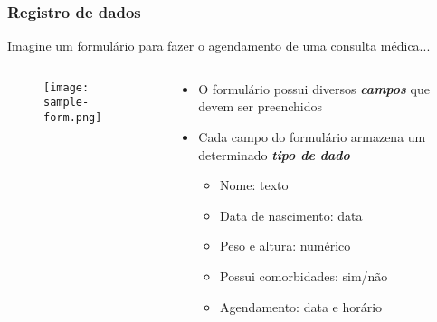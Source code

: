 \documentclass[t, 10pt, aspectratio=169, table, x11names]{beamer}
\begin{document}
	\begin{frame}
		\frametitle{Registro de dados}
		\vspace{3mm}
		Imagine um formulário para fazer o agendamento de uma consulta médica...
		\begin{columns}[t]
			\begin{column}{0.50\textwidth}
				\vspace{0.3cm}
				\begin{figure}[h]
					\texttt{[image: sample-form.png]}
				\end{figure}
			\end{column}
			\begin{column}{0.53\textwidth}
				\begin{itemize}					
					\item O formulário possui diversos \textit{\textbf{campos}} que devem ser preenchidos
					\vspace{2mm}
					\item Cada campo do formulário armazena um determinado \textit{\textbf{tipo de dado}}
					\vspace{2mm}
					\begin{itemize}
						\ttfamily\small
						\item Nome: texto
						\item Data de nascimento: data
						\item Peso e altura: numérico
						\item Possui comorbidades: sim/não
						\item Agendamento: data e horário
					\end{itemize}
				\end{itemize}
			\end{column}
			\begin{column}{0.05\textwidth}
			\end{column}
		\end{columns}
	\end{frame}
	
\end{document}
